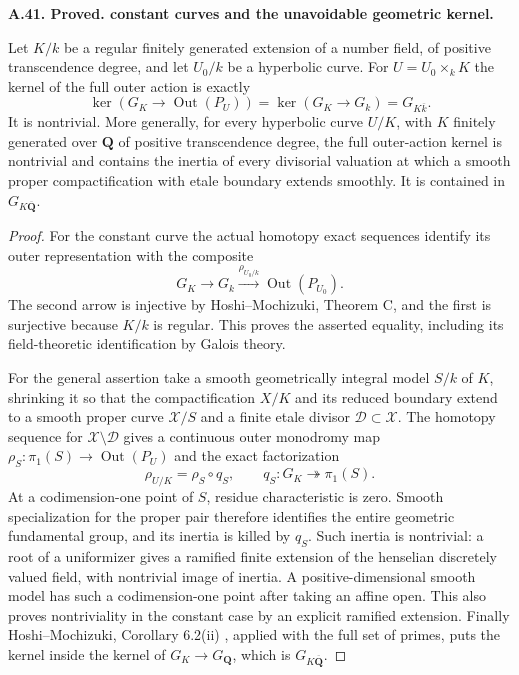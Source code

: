 \documentclass[11pt,oneside]{article}
\makeatletter
\newcounter{statementanchor}
\newenvironment{statement}[3]{%
 \refstepcounter{statementanchor}\def\@currentlabel{#1}%
 \par\addvspace{9pt}\noindent
 \textbf{#1. #2. #3.}\par\nobreak\noindent\ignorespaces
}{\par\addvspace{5pt}}
\makeatother
\begin{document}
\begin{statement}{A.41}{Proved}{constant curves and the unavoidable geometric kernel}
\label{st:A.41}
\label{A:constant-kernel}
Let $K/k$ be a regular finitely generated extension of a number
field, of positive transcendence degree, and let $U_0/k$ be a
hyperbolic curve. For $U=U_0\times_k K$ the kernel of the full
outer action is exactly
\[
 \ker(G_K\to\operatorname{Out}(P_U))
       =\ker(G_K\to G_k)=G_{K\overline k}.
\]
It is nontrivial. More generally, for every hyperbolic curve
$U/K$, with $K$ finitely generated over $\mathbf Q$ of positive
transcendence degree, the full outer-action kernel is nontrivial
and contains the inertia of every divisorial valuation at which
a smooth proper compactification with etale boundary extends
smoothly. It is contained in $G_{K\overline{\mathbf Q}}$.
\end{statement}
\begin{proof}
For the constant curve the actual homotopy exact sequences
identify its outer representation with the composite
\[
 G_K\longrightarrow G_k\xrightarrow{\rho_{U_0/k}}
                  \operatorname{Out}(P_{U_0}).
\]
The second arrow is injective by Hoshi--Mochizuki, Theorem C,
and the first is surjective because $K/k$ is regular. This
proves the asserted equality, including its field-theoretic
identification by Galois theory.

For the general assertion take a smooth geometrically integral
model $S/k$ of $K$, shrinking it so that the compactification
$X/K$ and its reduced boundary extend to a smooth proper
curve $\mathcal X/S$ and a finite etale divisor
$\mathcal D\subset\mathcal X$. The homotopy sequence for
$\mathcal X\setminus\mathcal D$ gives a continuous outer
monodromy map $\rho_S:\pi_1(S)\to\operatorname{Out}(P_U)$
and the exact factorization
\[
          \rho_{U/K}=\rho_S\circ q_S,
       \qquad q_S:G_K\twoheadrightarrow\pi_1(S).
\]
At a codimension-one point of $S$, residue characteristic is
zero. Smooth specialization for the proper pair therefore
identifies the entire geometric fundamental group, and its
inertia is killed by $q_S$. Such inertia is nontrivial:
a root of a uniformizer gives a ramified finite extension of
the henselian discretely valued field, with nontrivial image
of inertia. A positive-dimensional smooth model has such a
codimension-one point after taking an affine open. This also
proves nontriviality in the constant case by an explicit
ramified extension. Finally Hoshi--Mochizuki, Corollary 6.2(ii)
\cite{A_HoshiMochizuki2011}, applied with the full set of primes,
puts the kernel inside the kernel of $G_K\to G_{\mathbf Q}$,
which is $G_{K\overline{\mathbf Q}}$.
\end{proof}
\end{document}
